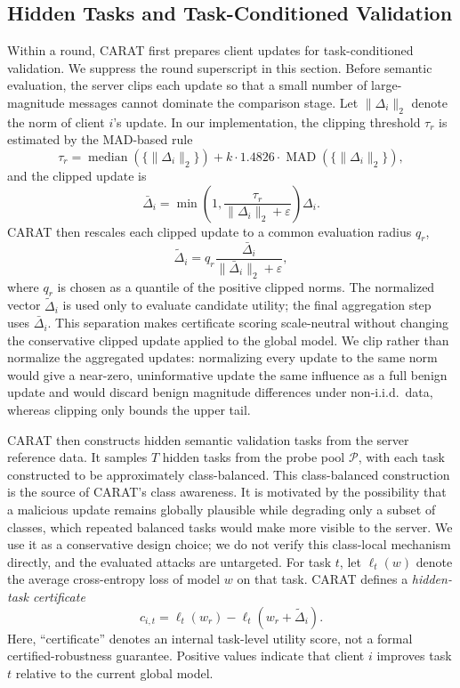 \subsection{Hidden Tasks and Task-Conditioned Validation}

Within a round, CARAT first prepares client updates for task-conditioned validation. We suppress the round superscript in this section. Before semantic evaluation, the server clips each update so that a small number of large-magnitude messages cannot dominate the comparison stage. Let $\|\Delta_i\|_2$ denote the norm of client $i$'s update. In our implementation, the clipping threshold $\tau_r$ is estimated by the MAD-based rule
\begin{equation}
\tau_r = \operatorname{median}(\{\|\Delta_i\|_2\}) +
k \cdot 1.4826 \cdot \operatorname{MAD}(\{\|\Delta_i\|_2\}),
\label{eq:clip}
\end{equation}
and the clipped update is
\begin{equation}
\bar{\Delta}_i = \min\left(1, \frac{\tau_r}{\|\Delta_i\|_2 + \varepsilon}\right)\Delta_i.
\end{equation}
CARAT then rescales each clipped update to a common evaluation radius $q_r$,
\begin{equation}
\tilde{\Delta}_i = q_r \frac{\bar{\Delta}_i}{\|\bar{\Delta}_i\|_2 + \varepsilon},
\label{eq:normalize}
\end{equation}
where $q_r$ is chosen as a quantile of the positive clipped norms. The normalized vector $\tilde{\Delta}_i$ is used only to evaluate candidate utility; the final aggregation step uses $\bar{\Delta}_i$. This separation makes certificate scoring scale-neutral without changing the conservative clipped update applied to the global model. We clip rather than normalize the aggregated updates: normalizing every update to the same norm would give a near-zero, uninformative update the same influence as a full benign update and would discard benign magnitude differences under non-i.i.d.\ data, whereas clipping only bounds the upper tail.

CARAT then constructs hidden semantic validation tasks from the server reference data. It samples $T$ hidden tasks from the probe pool $\mathcal{P}$, with each task constructed to be approximately class-balanced. This class-balanced construction is the source of CARAT's class awareness. It is motivated by the possibility that a malicious update remains globally plausible while degrading only a subset of classes, which repeated balanced tasks would make more visible to the server. We use it as a conservative design choice; we do not verify this class-local mechanism directly, and the evaluated attacks are untargeted. For task $t$, let $\ell_t(w)$ denote the average cross-entropy loss of model $w$ on that task. CARAT defines a \emph{hidden-task certificate}
\begin{equation}
c_{i,t} = \ell_t(w_r) - \ell_t(w_r + \tilde{\Delta}_i).
\label{eq:cert}
\end{equation}
Here, ``certificate'' denotes an internal task-level utility score, not a formal certified-robustness guarantee. Positive values indicate that client $i$ improves task $t$ relative to the current global model.

